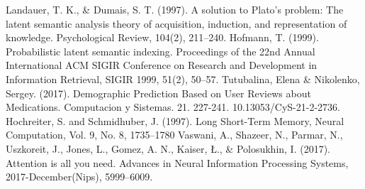 \documentclass[uplatex]{jsarticle}
\begin{document}
\begin{thebibliography}{数字}
     Landauer, T. K., \& Dumais, S. T. (1997). A solution to Plato's problem: The latent semantic analysis theory of acquisition, induction, and representation of knowledge. Psychological Review, 104(2), 211–240.
     Hofmann, T. (1999). Probabilistic latent semantic indexing. Proceedings of the 22nd Annual International ACM SIGIR Conference on Research and Development in Information Retrieval, SIGIR 1999, 51(2), 50–57.
     Tutubalina, Elena \& Nikolenko, Sergey. (2017). Demographic Prediction Based on User Reviews about Medications. Computacion y Sistemas. 21. 227-241. 10.13053/CyS-21-2-2736.
     Hochreiter, S. and Schmidhuber, J. (1997). Long Short-Term Memory, Neural Computation, Vol. 9, No. 8, 1735–1780
     Vaswani, A., Shazeer, N., Parmar, N., Uszkoreit, J., Jones, L., Gomez, A. N., Kaiser, Ł., \& Polosukhin, I. (2017). Attention is all you need. Advances in Neural Information Processing Systems, 2017-December(Nips), 5999–6009.
\end{thebibliography}
\end{document}
